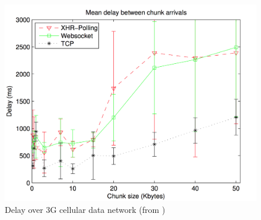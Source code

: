 \documentclass[10pt,journal,compsoc]{IEEEtran}
\begin{document}
\begin{figure}[!ht]
    \centering
    \includegraphics[width=\linewidth]{road.png}
    \caption{Delay over 3G cellular data network (from \cite{roadblock})}
    \label{fig:road}
\end{figure}
\end{document}
